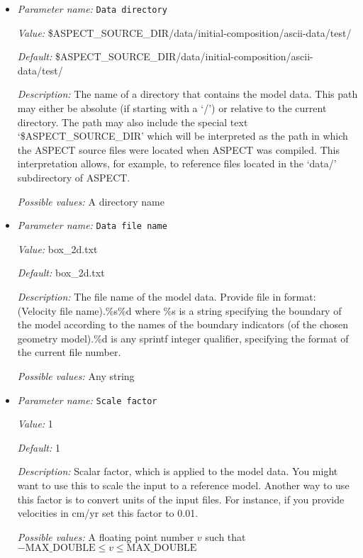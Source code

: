 \begin{itemize}
\item {\it Parameter name:} {\tt Data directory}
\label{parameters:Initial composition model/Ascii data model/Data directory}


{\it Value:} \$ASPECT\_SOURCE\_DIR/data/initial-composition/ascii-data/test/


{\it Default:} \$ASPECT\_SOURCE\_DIR/data/initial-composition/ascii-data/test/


{\it Description:} The name of a directory that contains the model data. This path may either be absolute (if starting with a `/') or relative to the current directory. The path may also include the special text `\$ASPECT\_SOURCE\_DIR' which will be interpreted as the path in which the ASPECT source files were located when ASPECT was compiled. This interpretation allows, for example, to reference files located in the `data/' subdirectory of ASPECT. 


{\it Possible values:} A directory name
\item {\it Parameter name:} {\tt Data file name}
\label{parameters:Initial composition model/Ascii data model/Data file name}


{\it Value:} box\_2d.txt


{\it Default:} box\_2d.txt


{\it Description:} The file name of the model data. Provide file in format: (Velocity file name).\%s\%d where \%s is a string specifying the boundary of the model according to the names of the boundary indicators (of the chosen geometry model).\%d is any sprintf integer qualifier, specifying the format of the current file number. 


{\it Possible values:} Any string
\item {\it Parameter name:} {\tt Scale factor}
\label{parameters:Initial composition model/Ascii data model/Scale factor}


{\it Value:} 1


{\it Default:} 1


{\it Description:} Scalar factor, which is applied to the model data. You might want to use this to scale the input to a reference model. Another way to use this factor is to convert units of the input files. For instance, if you provide velocities in cm/yr set this factor to 0.01.


{\it Possible values:} A floating point number $v$ such that $-\text{MAX\_DOUBLE} \leq v \leq \text{MAX\_DOUBLE}$
\end{itemize}

